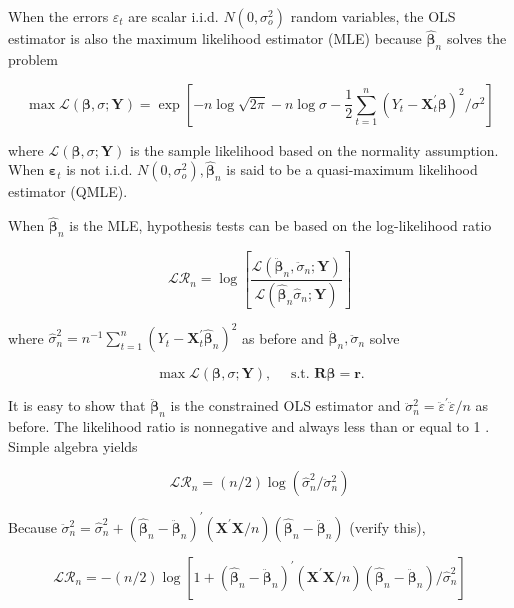 \documentclass[10pt]{article}
\begin{document}
When the errors $\varepsilon_{t}$ are scalar i.i.d. $N\left(0, \sigma_{o}^{2}\right)$ random variables, the OLS estimator is also the maximum likelihood estimator (MLE) because $\hat{\boldsymbol{\beta}}_{n}$ solves the problem

$$
\max \mathcal{L}(\boldsymbol{\beta}, \sigma ; \mathbf{Y})=\exp \left[-n \log \sqrt{2 \pi}-n \log \sigma-\frac{1}{2} \sum_{t=1}^{n}\left(Y_{t}-\mathbf{X}_{t}^{\prime} \boldsymbol{\beta}\right)^{2} / \sigma^{2}\right]
$$

where $\mathcal{L}(\boldsymbol{\beta}, \sigma ; \mathbf{Y})$ is the sample likelihood based on the normality assumption. When $\boldsymbol{\varepsilon}_{t}$ is not i.i.d. $N\left(0, \sigma_{o}^{2}\right), \hat{\boldsymbol{\beta}}_{n}$ is said to be a quasi-maximum likelihood estimator (QMLE).

When $\hat{\boldsymbol{\beta}}_{n}$ is the MLE, hypothesis tests can be based on the log-likelihood ratio

$$
\mathcal{L} \mathcal{R}_{n}=\log \left[\frac{\mathcal{L}\left(\ddot{\boldsymbol{\beta}}_{n}, \ddot{\sigma}_{n} ; \mathbf{Y}\right)}{\mathcal{L}\left(\hat{\boldsymbol{\beta}}_{n} \hat{\sigma}_{n} ; \mathbf{Y}\right)}\right]
$$

where $\hat{\sigma}_{n}^{2}=n^{-1} \sum_{t=1}^{n}\left(Y_{t}-\mathbf{X}_{t}^{\prime} \hat{\boldsymbol{\beta}}_{n}\right)^{2}$ as before and $\ddot{\boldsymbol{\beta}}_{n}, \ddot{\sigma}_{n}$ solve

$$
\max \mathcal{L}(\boldsymbol{\beta}, \sigma ; \mathbf{Y}), \quad \text { s.t. } \mathbf{R} \boldsymbol{\beta}=\mathbf{r} .
$$

It is easy to show that $\ddot{\boldsymbol{\beta}}_{n}$ is the constrained OLS estimator and $\ddot{\sigma}_{n}^{2}=\ddot{\varepsilon}^{\prime} \ddot{\varepsilon} / n$ as before. The likelihood ratio is nonnegative and always less than or equal to 1 . Simple algebra yields

$$
\mathcal{L} \mathcal{R}_{n}=(n / 2) \log \left(\hat{\sigma}_{n}^{2} / \ddot{\sigma}_{n}^{2}\right)
$$

Because $\ddot{\sigma}_{n}^{2}=\hat{\sigma}_{n}^{2}+\left(\hat{\boldsymbol{\beta}}_{n}-\ddot{\boldsymbol{\beta}}_{n}\right)^{\prime}\left(\mathbf{X}^{\prime} \mathbf{X} / n\right)\left(\hat{\boldsymbol{\beta}}_{n}-\ddot{\boldsymbol{\beta}}_{n}\right)$ (verify this),

$$
\mathcal{L} \mathcal{R}_{n}=-(n / 2) \log \left[1+\left(\hat{\boldsymbol{\beta}}_{n}-\ddot{\boldsymbol{\beta}}_{n}\right)^{\prime}\left(\mathbf{X}^{\prime} \mathbf{X} / n\right)\left(\hat{\boldsymbol{\beta}}_{n}-\ddot{\boldsymbol{\beta}}_{n}\right) / \hat{\sigma}_{n}^{2}\right]
$$
\end{document}
